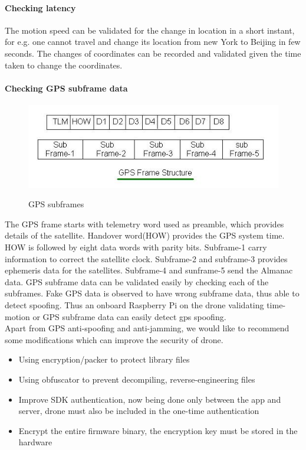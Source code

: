 \documentclass[conference]{IEEEtran}
\begin{document}
\paragraph*{Checking latency}
The motion speed can be validated for the change in location in a short instant, for e.g. one cannot travel and change its location from new York to Beijing in few seconds. The changes of coordinates can be recorded and validated given the time taken to change the coordinates.
\paragraph*{Checking GPS subframe data}
\begin{figure}[h!]
	\centering
	\includegraphics[width=0.9\columnwidth]{gps}
	\label{fig:gps_frame}
	\caption{GPS subframes}
\end{figure}
The GPS frame starts with telemetry word used as preamble, which provides details of the satellite. Handover word(HOW) provides the GPS system time. HOW is followed by eight data words with parity bits. Subframe-1 carry information to correct the satellite clock. Subframe-2 and subframe-3 provides ephemeris data for the satellites. Subframe-4 and sunframe-5 send the Almanac data. 
GPS subframe data can be validated easily by checking each of the subframes. Fake GPS data is observed to have wrong subframe data, thus able to detect spoofing. 
Thus an onboard Raspberry Pi on the drone validating time-motion or GPS subframe data can easily detect gps spoofing.
\\
Apart from GPS anti-spoofing and anti-jamming, we would like to recommend some modifications which can improve the security of drone. 
\begin{itemize}
	\item Using encryption/packer to protect library files
	\item Using obfuscator to prevent decompiling, reverse-engineering files
	\item Improve SDK authentication, now being done only between the app and server, drone must also be included in the one-time authentication
	\item Encrypt the entire firmware binary, the encryption key must be stored in the hardware
\end{itemize}
\end{document}
